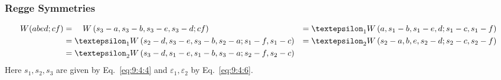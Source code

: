 \subsubsection{Regge Symmetries}
\begin{alignat}{2}
W(a b e d ; c f)&=\quad W\left(s_{3}-a, s_{3}-b, s_{3}-e, s_{3}-d ; c f\right)&=\varepsilon_{1} W\left(a, s_{1}-b, s_{1}-e, d ; s_{1}-c, s_{1}-f\right)  \notag\\
&=\varepsilon_{1} W\left(s_{2}-d, s_{3}-e, s_{3}-b, s_{2}-a ; s_{1}-f, s_{1}-c\right)&=\varepsilon_{2} W\left(s_{2}-a, b, e, s_{2}-d ; s_{2}-c, s_{2}-f\right)  \notag\\
&=\varepsilon_{2} W\left(s_{3}-d, s_{1}-e, s_{1}-b, s_{3}-a ; s_{2}-f, s_{2}-c\right) \label{eq:9:4:7}
\end{alignat}
Here $s_{1}, s_{2}, s_{3}$ are given by Eq.~\eqref{eq:9:4:4} and $\varepsilon_{1}, \varepsilon_{2}$ by Eq.~\eqref{eq:9:4:6}.

